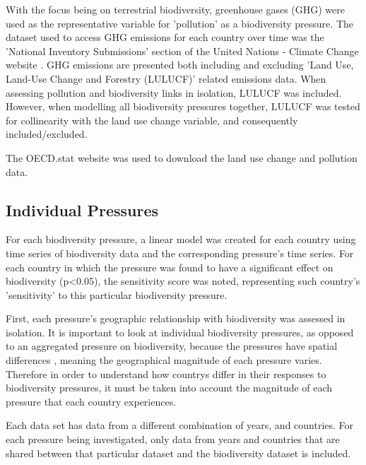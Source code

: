 \documentclass[11pt, a4paper, titlepage]{article}
\begin{document}
	With the focus being on terrestrial biodiversity, greenhouse gases (GHG) were used as the representative variable for 'pollution' as a biodiversity pressure. The dataset used to access GHG emissions for each country over time was the 'National Inventory Submissions' section of the United Nations - Climate Change website \cite{united nations}. GHG emissions are presented both including and excluding 'Land Use, Land-Use Change and Forestry (LULUCF)' related emissions data. When assessing pollution and biodiversity links in isolation, LULUCF was included. However, when modelling all biodiversity pressures together, LULUCF was tested for collinearity with the land use change variable, and consequently included/excluded. \newline
	
	The OECD.stat website was used to download the land use change and pollution data. \newline

	

	
	\subsection*{Individual Pressures}
	
	For each biodiversity pressure, a linear model was created for each country using time series of biodiversity data and the corresponding pressure's time series. For each country in which the pressure was found to have a significant effect on biodiversity (p<0.05), the sensitivity score was noted, representing such country's 'sensitivity' to this particular biodiversity pressure. \newline
	
	First, each pressure's geographic relationship with biodiversity was assessed in isolation. It is important to look at individual biodiversity pressures, as opposed to an aggregated pressure on biodiversity, because the pressures have spatial differences \cite{steffen2015planetary}, meaning the geographical magnitude of each pressure varies. Therefore in order to understand how countrys differ in their responses to biodiversity pressures, it must be taken into account the magnitude of each pressure that each country experiences. \newline
	
	Each data set has data from a different combination of years, and countries. For each pressure being investigated, only data from years and countries that are shared between that particular dataset and the biodiversity dataset is included. \newline
	
\end{document}
